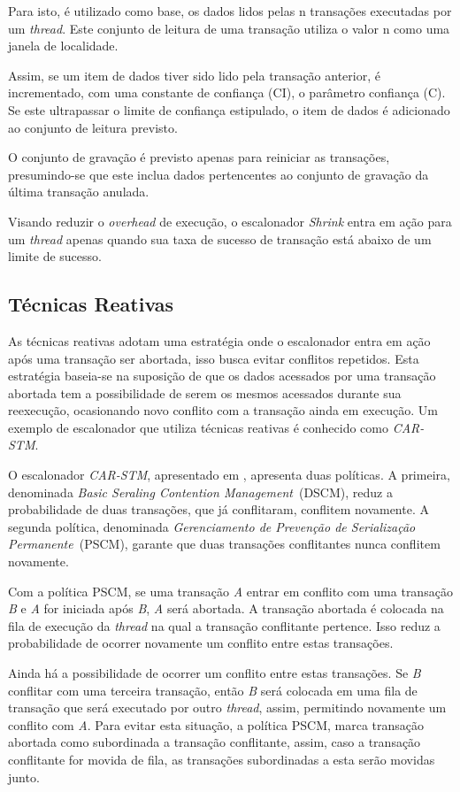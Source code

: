 \documentclass[ti]{texufpel} %
\begin{document}
Para isto, é utilizado como base, os dados lidos pelas n transações executadas por um \emph{thread}. Este conjunto de leitura de uma transação utiliza o valor n como uma janela de localidade.

Assim, se um item de dados tiver sido lido pela transação anterior, é incrementado, com uma constante de confiança (CI), o parâmetro confiança (C). Se este ultrapassar o limite de confiança estipulado, o item de dados é adicionado ao conjunto de leitura previsto.

O conjunto de gravação é previsto apenas para reiniciar as transações, presumindo-se que este inclua dados pertencentes ao conjunto de gravação da última transação anulada.

Visando reduzir o \emph{overhead} de execução, o escalonador \emph{Shrink} entra em ação para um \emph{thread} apenas quando sua taxa de sucesso de transação está abaixo de um limite de sucesso.


\subsection{Técnicas Reativas}

As técnicas reativas adotam uma estratégia onde o escalonador entra em ação após uma transação ser abortada, isso busca evitar conflitos repetidos. Esta estratégia baseia-se na suposição de que os dados acessados por uma transação abortada tem a possibilidade de serem os mesmos acessados durante sua reexecução, ocasionando novo conflito com a transação ainda em execução. Um exemplo de escalonador que utiliza técnicas reativas é conhecido como \emph{CAR-STM}.

O escalonador \emph{CAR-STM}, apresentado em \cite{dolev08}, apresenta duas políticas. A primeira, denominada \emph{Basic Seraling Contention Management}~(DSCM), reduz a probabilidade de duas transações, que já conflitaram, conflitem novamente. A segunda política, denominada \emph{Gerenciamento de Prevenção de Serialização Permanente}~(PSCM), garante que duas transações conflitantes nunca conflitem novamente.

Com a política PSCM, se uma transação \emph{A} entrar em conflito com uma transação \emph{B} e \emph{A} for iniciada após \emph{B}, \emph{A} será abortada. A transação abortada é colocada na fila de execução da \emph{thread} na qual a transação conflitante pertence. Isso reduz a probabilidade de ocorrer novamente um conflito entre estas transações.

Ainda há a possibilidade de ocorrer um conflito entre estas transações. Se \emph{B} conflitar com uma terceira transação, então \emph{B} será colocada em uma fila de transação que será executado por outro \emph{thread}, assim, permitindo novamente um conflito com \emph{A}. Para evitar esta situação, a política PSCM, marca transação abortada como subordinada a transação conflitante, assim, caso a transação conflitante for movida de fila, as transações subordinadas a esta serão movidas junto.
\end{document}

